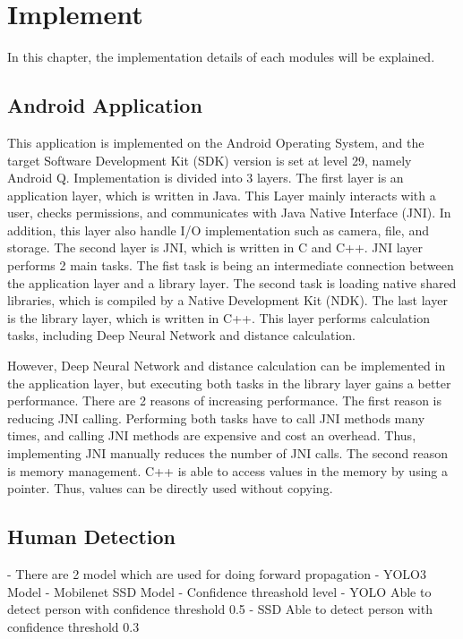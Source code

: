 \chapter{Implement}\label{implement}

    In this chapter, the implementation details of each modules will be explained.

    \section{Android Application}
        This application is implemented on the Android Operating System, and the target Software Development Kit (SDK) version is set at level 29, namely Android Q.
        Implementation is divided into 3 layers.
            The first layer is an application layer, which is written in Java.
                This Layer mainly interacts with a user, checks permissions, and communicates with Java Native Interface (JNI).
                In addition, this layer also handle I/O implementation such as camera, file, and storage.
            The second layer is JNI, which is written in C and C++.
                JNI layer performs 2 main tasks.
                    The fist task is being an intermediate connection between the application layer and a library layer.
                    The second task is loading native shared libraries, which is compiled by a Native Development Kit (NDK).
            The last layer is the library layer, which is written in C++.
                This layer performs calculation tasks, including Deep Neural Network and distance calculation.

        However, Deep Neural Network and distance calculation can be implemented in the application layer,
        but executing both tasks in the library layer gains a better performance. There are 2 reasons of increasing performance.
            The first reason is reducing JNI calling. Performing both tasks have to call JNI methods many times, and calling JNI methods are expensive and cost an overhead.
                Thus, implementing JNI manually reduces the number of JNI calls.
            The second reason is memory management. C++ is able to access values in the memory by using a pointer.
                Thus, values can be directly used without copying.

    \section{Human Detection}
        -	There are 2 model which are used for doing forward propagation
            - YOLO3 Model
            - Mobilenet SSD Model
            - Confidence threashold  level
                - YOLO Able to detect person with confidence threshold 0.5
                - SSD Able to detect person with confidence threshold 0.3

